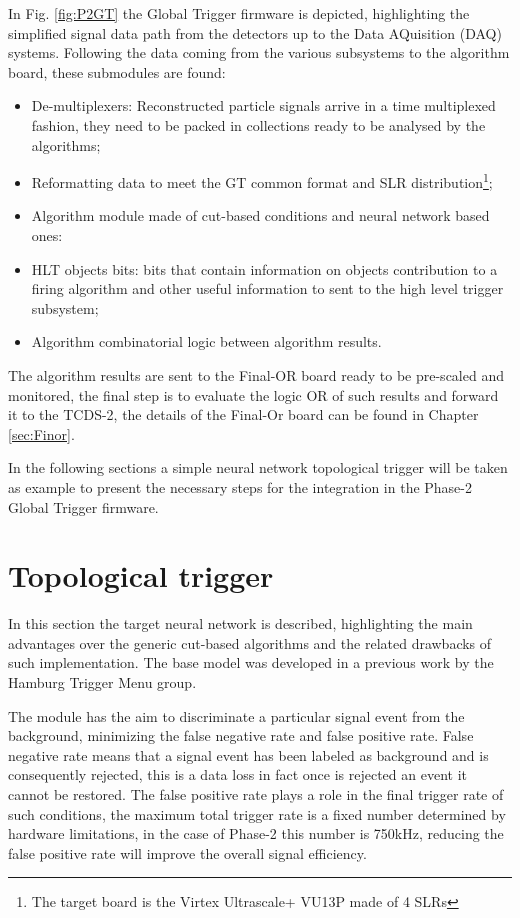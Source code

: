 \documentclass[../../main.tex]{subfiles}
\begin{document}
In Fig. \ref{fig:P2GT} the Global Trigger firmware is depicted, highlighting the simplified signal data path from the detectors up to the Data AQuisition (DAQ) systems. Following the data coming from the various subsystems to the algorithm board, these submodules are found:
\begin{itemize}
    \item De-multiplexers: Reconstructed particle signals arrive in a time multiplexed fashion, they need to be packed in collections ready to be analysed by the algorithms;
    \item Reformatting data to meet the GT common format and SLR distribution\footnote{The target board is the Virtex Ultrascale+ VU13P made of 4 SLRs};
    \item Algorithm module made of cut-based conditions and neural network based ones:
    \item HLT objects bits: bits that contain information on objects contribution to a firing algorithm and other useful information to sent to the high level trigger subsystem;
    \item Algorithm combinatorial logic between algorithm results.
\end{itemize}
The algorithm results are sent to the Final-OR board ready to be pre-scaled and monitored, the final step is to evaluate the logic OR of such results and forward it to the TCDS-2, the details of the Final-Or board can be found in Chapter \ref{sec:Finor}.



In the following sections a simple neural network topological trigger will be taken as example to present the necessary steps for the integration in the Phase-2 Global Trigger firmware. 
    
\section{Topological trigger}
\label{sec:P2GT_NN}

In this section the target neural network is described, highlighting the main advantages over the generic cut-based algorithms and the related drawbacks of such implementation. The base model was developed in a previous work\cite{Ihor_thesis} by the Hamburg Trigger Menu group.  

The module has the aim to discriminate a particular signal event from the background, minimizing the false negative rate and false positive rate. False negative rate means that a signal event has been labeled as background and is consequently rejected, this is a data loss in fact once is rejected an event it cannot be restored. The false positive rate plays a role in the final trigger rate of such conditions, the maximum total trigger rate is a fixed number determined by hardware limitations, in the case of Phase-2 this number is 750kHz, reducing the false positive rate will improve the overall signal efficiency.     
\end{document}

